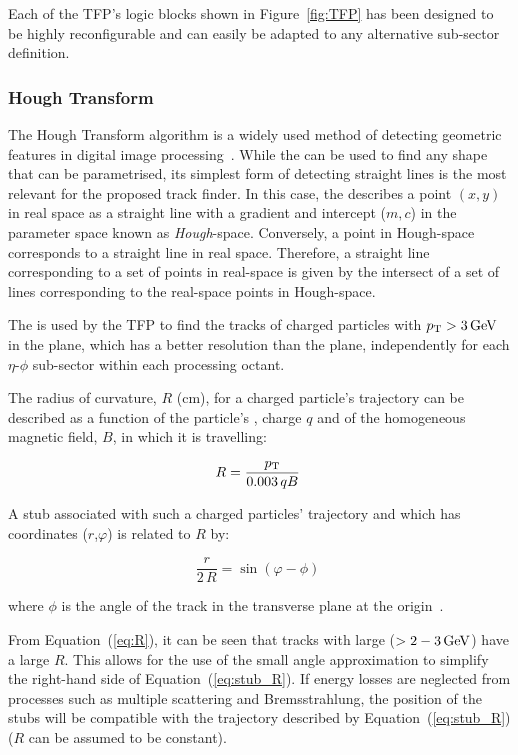 Each of the TFP's logic blocks shown in Figure~\ref{fig:TFP} has been designed to be highly reconfigurable and can easily be adapted to any alternative sub-sector definition.

\subsubsection{Hough Transform}
The Hough Transform algorithm is a widely used method of detecting geometric features in digital image processing~\cite{HT}.
While the \HT can be used to find any shape that can be parametrised, its simplest form of detecting straight lines is the most relevant for the proposed track finder.
In this case, the \HT describes a point $(x,y)$ in real space as a straight line with a gradient and intercept ($m,c$) in the parameter space known as \emph{Hough}-space.
Conversely, a point in Hough-space corresponds to a straight line in real space. 
Therefore, a straight line corresponding to a set of points in real-space is given by the intersect of a set of lines corresponding to the real-space points in Hough-space.

The \HT is used by the TFP to find the tracks of charged particles with $p_{\mathrm{T}} > 3\,\text{Ge\hspace{-.08em}V}$ in the \rphi plane, which has a better resolution than the \rz plane, independently for each $\eta$-$\phi$ sub-sector within each processing octant.

The radius of curvature, $R$ (cm), for a charged particle's trajectory can be described as a function of the particle's \pT, charge $q$ and of the homogeneous magnetic field, $B$, in which it is travelling:

\begin{equation}
R = \frac{p_{\mathrm{T}}}{0.003\,qB} \;
\label{eq:R}
\end{equation}

A stub associated with such a charged particles' trajectory and which has coordinates ($r$,$\varphi$) is related to $R$ by:

\begin{equation}
\frac {r}{2\,R} = \sin\left(\varphi-\phi\right)\;
\label{eq:stub_R}
\end{equation}

where $\phi$ is the angle of the track in the transverse plane at the origin~\cite{markthesis}. 

From Equation~(\ref{eq:R}), it can be seen that tracks with large \pT ($> 2-3\,\text{Ge\hspace{-.08em}V}$) have a large $R$.
This allows for the use of the small angle approximation to simplify the right-hand side of Equation~(\ref{eq:stub_R}).
If energy losses are neglected from processes such as multiple scattering and Bremsstrahlung, the position of the stubs will be compatible with the trajectory described by Equation~(\ref{eq:stub_R}) (\ie $R$ can be assumed to be constant).

